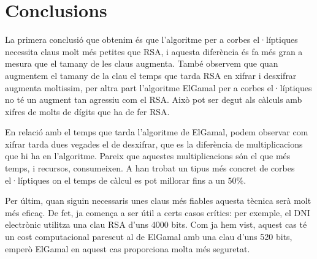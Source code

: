 \documentclass[journal]{IEEEtran}
\begin{document}
\section{Conclusions}
La primera conclusió que obtenim és que l'algoritme per a corbes el·líptiques necessita claus molt més petites que RSA, i aquesta diferència és fa més gran a mesura que el tamany de les claus augmenta. També observem que quan augmentem el tamany de la clau el temps que tarda RSA en xifrar i desxifrar augmenta moltissim, per altra part l'algoritme ElGamal per a corbes el·líptiques no té un augment tan agressiu com el RSA. Això pot ser degut als càlculs amb xifres de molts de dígits que ha de fer RSA.

En relació amb el temps que tarda l'algoritme de ElGamal, podem observar com xifrar tarda dues vegades el de desxifrar, que es la diferència de multiplicacions que hi ha en l'algoritme. Pareix que aquestes multiplicacions són el que més temps, i recursos, consumeixen. A \cite{FastPoint} han trobat un tipus més concret de corbes el·líptiques on el temps de càlcul es pot millorar fins a un $50 \%$.

Per últim,  quan siguin necessaris unes claus més fiables aquesta tècnica serà molt més eficaç. De fet, ja comença a ser útil a certs casos crítics: per exemple, el DNI electrònic utilitza una clau RSA d'uns 4000 bits. Com ja hem vist, aquest cas té un cost computacional parescut al de ElGamal amb una clau d'uns 520 bits, emperò ElGamal en aquest cas proporciona molta més seguretat.



\end{document}
